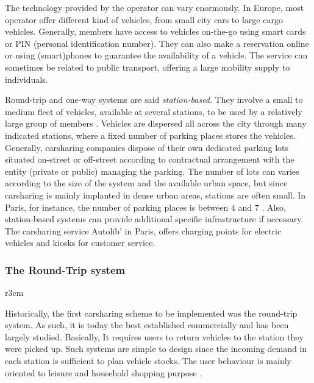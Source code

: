 \medskip
The technology provided by the operator can vary enormously.
In Europe, most operator offer different kind of vehicles, from small city cars to large cargo vehicles.
Generally, members have access to vehicles on-the-go using smart cards or PIN (personal identification number).
They can also make a reservation online or using (smart)phones to guarantee the availability of a vehicle.
The service can sometimes be related to public transport, offering a large mobility supply to individuals.

\medskip
Round-trip and one-way systems are said \textit{station-based}.
They involve a small to medium fleet of vehicles, available at several stations, to be used by a relatively large group of members \cite{shaheen_short_1999}.
Vehicles are dispersed all across the city through many indicated stations, where a fixed number of parking places stores the vehicles.
Generally, carsharing companies dispose of their own dedicated parking lots situated on-street or off-street according to contractual arrangement with the entity (private or public) managing the parking.
The number of lots can varies according to the size of the system and the available urban space, but since carsharing is mainly implanted in dense urban areas, stations are often small.
In Paris, for instance, the number of parking places is between $4$ and $7$ \cite{autolib_rapport_2014}.
Also, station-based systems can provide additional specific infrastructure if necessary.
The carsharing service Autolib' in Paris, offers charging points for electric vehicles and kiosks for customer service.


\subsubsection{The Round-Trip system}
\begin{wrapfigure}[6]{r}{3cm}
\vspace{-.4cm}
\end{wrapfigure}
Historically, the first carsharing scheme to be implemented was the round-trip system.
As such, it is today the best established commercially and has been largely studied.
Basically, It requires users to return vehicles to the station they were picked up.
Such systems are simple to design since the incoming demand in each station is sufficient to plan vehicle stocks.
The user behaviour is mainly oriented to leisure and household shopping purpose \cite{barth_shared_use_2002, costain_synopsis_2012}.


